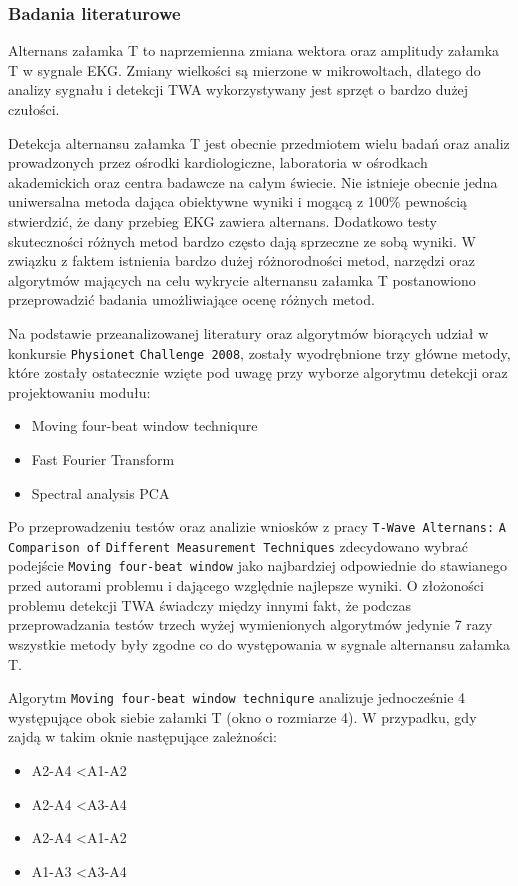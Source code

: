 \documentclass[a4paper, 11pt]{article}
\begin{document}
\subsubsection{Badania literaturowe}
\label{sec::t_wave_alt:papers}
Alternans załamka T to naprzemienna zmiana wektora oraz amplitudy załamka T w sygnale EKG. Zmiany wielkości są mierzone w mikrowoltach, dlatego do analizy sygnału i detekcji TWA wykorzystywany jest sprzęt o bardzo dużej czułości. 

Detekcja alternansu załamka T jest obecnie przedmiotem wielu badań oraz analiz prowadzonych przez ośrodki kardiologiczne, laboratoria w ośrodkach akademickich oraz centra badawcze na całym świecie. Nie istnieje obecnie jedna uniwersalna metoda dająca obiektywne wyniki i mogącą z 100\% pewnością stwierdzić, że dany przebieg EKG zawiera alternans. Dodatkowo testy skuteczności różnych metod bardzo często dają sprzeczne ze sobą wyniki. W związku z faktem istnienia bardzo dużej różnorodności metod, narzędzi oraz algorytmów mających na celu wykrycie alternansu załamka T postanowiono przeprowadzić badania umożliwiające ocenę różnych metod.

Na podstawie przeanalizowanej literatury oraz algorytmów biorących udział w konkursie \verb|Physionet|  \verb|Challenge 2008|, zostały wyodrębnione trzy główne metody, które zostały ostatecznie wzięte pod uwagę przy wyborze algorytmu detekcji oraz projektowaniu modułu:
\begin{itemize}
	\item Moving four-beat window techniqure
	\item Fast Fourier Transform
	\item Spectral analysis PCA
\end{itemize}

Po przeprowadzeniu testów oraz analizie wniosków z pracy  \verb|T-Wave Alternans:|  \verb|A Comparison of|  \verb|Different Measurement Techniques| zdecydowano wybrać podejście  \verb|Moving four-beat window| jako najbardziej odpowiednie do stawianego przed autorami problemu i dającego względnie najlepsze wyniki. O złożoności problemu detekcji TWA świadczy między innymi fakt, że podczas przeprowadzania testów trzech wyżej wymienionych algorytmów jedynie 7 razy wszystkie metody były zgodne co do występowania w sygnale alternansu załamka T. 

Algorytm \verb|Moving four-beat window techniqure| analizuje jednocześnie 4 występujące obok siebie załamki T (okno o rozmiarze 4). W przypadku, gdy zajdą w takim oknie następujące zależności: 
\begin{itemize}
	\item A2-A4 \textless A1-A2
	\item A2-A4 \textless A3-A4
	\item A2-A4 \textless A1-A2
	\item A1-A3 \textless A3-A4
\end{itemize}
\end{document}
